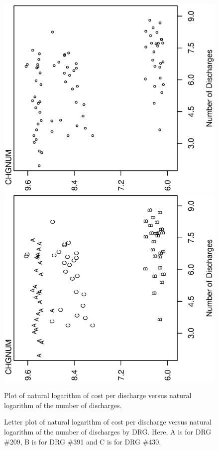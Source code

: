 \begin{figure}[htp]
  \begin{center}
    \includegraphics[width=1\textwidth,angle=270,scale=0.45]{Chapter4/F4CostperNumber.ps}
    \includegraphics[width=1\textwidth,angle=270,scale=0.45]{Chapter4/F4DRGbyNumber.ps} \hfill
    \parbox[t]{2.5in}{\caption{\label{F4:CostperNumber} \small  Plot of natural logarithm of cost per discharge versus natural
logarithm of the number of discharges.}} \hfill
    \parbox[t]{2.5in}{\caption{\label{F4:DRGbyNumber} \small  Letter plot of natural logarithm of cost per discharge versus natural
logarithm of the number of discharges by DRG. Here, A is for DRG
\#209, B is for DRG \#391 and C is for DRG \#430.}}
  \end{center}
\end{figure}


